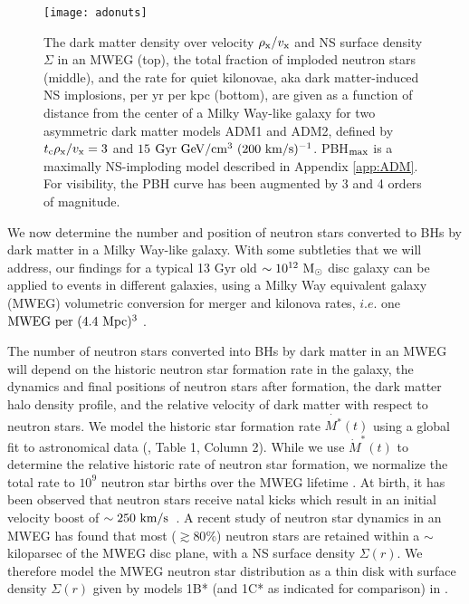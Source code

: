\documentclass[nofootinbib,longbibliography,prd,floatfix,superscriptaddress,twocolumn]{revtex4-1}
\begin{document}
\begin{figure}[t]
\texttt{[image: adonuts]}
\caption{The dark matter density over velocity $\rho_{\rm x}/v_{\rm x}$ and NS surface density $\Sigma$ in an MWEG (top), the total fraction of imploded neutron stars (middle), and the rate for quiet kilonovae, aka dark matter-induced NS implosions, per yr per kpc (bottom), are given as a function of distance from the center of a Milky Way-like galaxy for two asymmetric dark matter models ADM1 and ADM2, defined by $t_{\rm c} \rho_{\rm x} /v_{\rm x}  = 3$ and $15$ $\rm Gyr~GeV/cm^3~ (200 ~km/s)^{-1}$. PBH$_{\rm max}$ is a maximally NS-imploding model described in Appendix \ref{app:ADM}. For visibility, the PBH curve has been augmented by 3 and 4 orders of magnitude. }
\label{fig:adonuts}
\end{figure}

We now determine the number and position of neutron stars converted to BHs by dark matter in a Milky Way-like galaxy. With some subtleties that we will address, our findings for a typical 13 Gyr old $\sim 10^{12} \rm ~M_{\odot}$ disc galaxy can be applied to events in different galaxies, using a Milky Way equivalent galaxy (MWEG) volumetric conversion for merger and kilonova rates, $i.e.$ one ${\rm MWEG}~{\rm per} ~(4.4~{\rm Mpc})^3$ \cite{Abadie:2010cf}. 

The number of neutron stars converted into BHs by dark matter in an MWEG will depend on the historic neutron star formation rate in the galaxy, the dynamics and final positions of neutron stars after formation, the dark matter halo density profile, and the relative velocity of dark matter with respect to neutron stars. We model the historic star formation rate $\dot{M^*}(t)$ using a global fit to astronomical data (\cite{Hopkins:2006bw}, Table 1, Column 2). While we use $\dot{M}^*(t)$ to determine the relative historic rate of neutron star formation, we normalize the total rate to $10^9$ neutron star births over the MWEG lifetime \cite{1990ApJ...348..485P,1993ApJ...403..690B,2010A&A...510A..23S}. At birth, it has been observed that neutron stars receive natal kicks which result in an initial velocity boost of $\sim 250 ~{\rm km/s}$~\citep{Hobbs:2005yx,FaucherGiguere:2005ny}. A recent study of neutron star dynamics in an MWEG has found that most ($\gtrsim 80 \%$) neutron stars are retained within a $\sim$kiloparsec of the MWEG disc plane, with a NS surface density $\Sigma(r)$. We therefore model the MWEG neutron star distribution as a thin disk with surface density $\Sigma(r)$ given by models 1B* (and 1C* as indicated for comparison) in \cite{2010A&A...510A..23S}.
\end{document}
